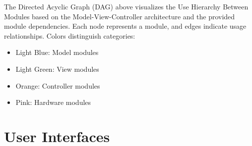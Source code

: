 \documentclass[12pt, titlepage]{article}
\begin{document}
The Directed Acyclic Graph (DAG) above visualizes the Use Hierarchy Between Modules based on the Model-View-Controller architecture and the provided module dependencies. Each node represents a module, and edges indicate usage relationships. Colors distinguish categories:
\begin{itemize}
\item Light Blue: Model modules
\item Light Green: View modules
\item Orange: Controller modules
\item Pink: Hardware modules
\end{itemize}



\section{User Interfaces}


\newpage{}
\end{document}
